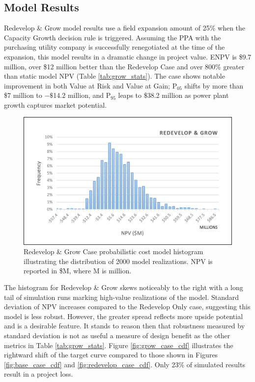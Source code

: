 \subsection{Model Results}\label{ch6:grow_results}

Redevelop \& Grow model results use a field expansion amount of 25\% when the Capacity Growth decision rule is triggered. Assuming the PPA with the purchasing utility company is successfully renegotiated at the time of the expansion, this model results in a dramatic change in project value. ENPV is \$9.7 million, over \$12 million better than the Redevelop Case and over 800\% greater than static model NPV (Table \ref{tab:grow_stats}). The case shows notable improvement in both Value at Risk and Value at Gain; P$_{05}$ shifts by more than \$7 million to $-\$$14.2 million, and P$_{95}$ leaps to \$38.2 million as power plant growth captures market potential.

\begin{figure}[!htp]
\centering
\includegraphics[width=.85\textwidth]{templates/images/Figure-Grow_Case_Histogram.png}
\caption[Redevelop \& Grow Case histogram]{Redevelop \& Grow Case probabilistic cost model histogram illustrating the distribution of 2000 model realizations. NPV is reported in \$M, where M is million.}
\label{fig:grow_case_hist}
\end{figure}

The histogram for Redevelop \& Grow skews noticeably to the right with a long tail of simulation runs marking high-value realizations of the model. Standard deviation of NPV increases compared to the Redevelop Only case, suggesting this model is less robust. However, the greater spread reflects more upside potential and is a desirable feature. It stands to reason then that robustness measured by standard deviation is not as useful a measure of design benefit as the other metrics in Table \ref{tab:grow_stats}. Figure \ref{fig:grow_case_cdf} illustrates the rightward shift of the target curve compared to those shown in Figures \ref{fig:base_case_cdf} and \ref{fig:redevelop_case_cdf}. Only 23\% of simulated results result in a project loss. 

